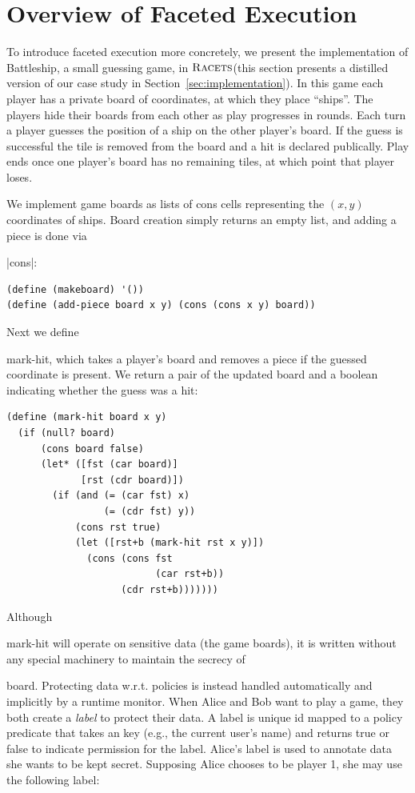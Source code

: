 \documentclass[review=true,acmlarge]{acmart}
\newcommand*{\SavedLstInline}{}
\DeclareRobustCommand*{\lstinline}{%
  \ifmmode
    \let\SavedBGroup\bgroup
    \def\bgroup{%
      \let\bgroup\SavedBGroup
      \hbox\bgroup
    }%
  \fi
  \SavedLstInline
}
\newcommand{\colorMATH}{black!20!blue}
\newcommand{\blue}[1] {{\color{\colorMATH} #1}}
\newcommand{\code}[1]{\lstinline{#1}}
\newcommand{\racets}[0]{$\textsc{Racets}$\xspace}
\begin{document}
\section{Overview of Faceted Execution}
\label{sec:overview}

To introduce faceted execution more concretely, we present the implementation
of Battleship, a small guessing game, in \racets (this section presents a
distilled version of our case study in
Section~\ref{sec:implementation}). In this game each player has a
private board of coordinates, at which they place ``ships''. The players
hide their boards from each other as play progresses in rounds. Each
turn a player guesses the position of a ship on the other player's
board. If the guess is successful the tile is removed from the
board and a hit is declared publically. Play ends once one player's board
has no remaining tiles, at which point that player loses.

We implement game boards as lists of cons cells representing the
\blue{$(x,y)$} coordinates of ships. Board creation simply returns an empty
list, and adding a piece is done via \lstinline|cons|:

\begin{lstlisting}[language=Racket,escapechar=|,name=example]
(define (makeboard) '())
(define (add-piece board x y) (cons (cons x y) board))
\end{lstlisting}

Next we define \code{mark-hit}, which takes a player's board and
removes a piece if the guessed coordinate is present. We 
return a pair of the updated board and a boolean indicating
whether the guess was a hit:

\begin{lstlisting}[language=Racket,escapechar=|,name=example]
(define (mark-hit board x y)
  (if (null? board)
      (cons board false)
      (let* ([fst (car board)]
             [rst (cdr board)])
        (if (and (= (car fst) x)
                 (= (cdr fst) y))
            (cons rst true)
            (let ([rst+b (mark-hit rst x y)])
              (cons (cons fst
                          (car rst+b))
                    (cdr rst+b)))))))
\end{lstlisting}

Although \code{mark-hit} will operate on sensitive data (the game
boards), it is written without any special machinery to maintain the
secrecy of \code{board}. Protecting data {w.r.t.} policies is instead handled
automatically and implicitly by a runtime monitor.
When Alice and Bob want to play a game, they both create a
\emph{label} to protect their data. A label is unique id mapped to a policy predicate
that takes an key (e.g., the current user's name) and returns true or false to indicate
permission for the label. Alice's label is used to annotate data she wants
to be kept secret. Supposing Alice chooses to be player 1, she may use the
following label:
\end{document}
